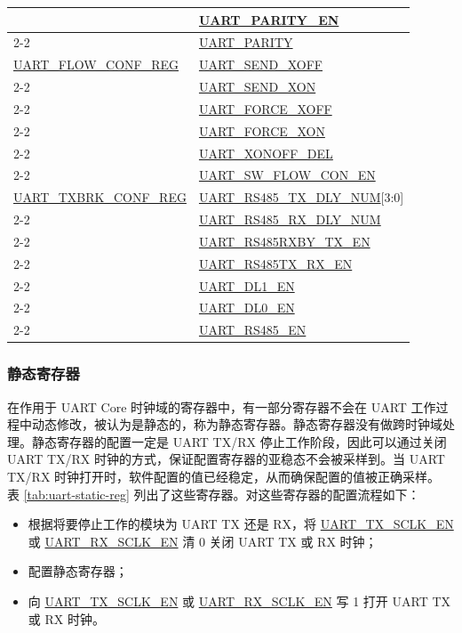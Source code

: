 \documentclass[main\_\_CN.tex]{subfiles}
\begin{document}
\begin{longtable}[c]{|m{6cm}|m{6cm}|}
 & \hyperref[fielddesc:UARTPARITYEN]{UART\_PARITY\_EN} \\\cline{2-2}
 & \hyperref[fielddesc:UARTPARITY]{UART\_PARITY} \\\hline
\hyperref[regdesc:UARTFLOWCONFREG]{UART\_FLOW\_CONF\_REG}  & \hyperref[fielddesc:UARTSENDXOFF]{UART\_SEND\_XOFF} \\\cline{2-2}
 & \hyperref[fielddesc:UARTSENDXON]{UART\_SEND\_XON} \\\cline{2-2}
 & \hyperref[fielddesc:UARTFORCEXOFF]{UART\_FORCE\_XOFF} \\\cline{2-2}
 & \hyperref[fielddesc:UARTFORCEXON]{UART\_FORCE\_XON} \\\cline{2-2}
 & \hyperref[fielddesc:UARTXONOFFDEL]{UART\_XONOFF\_DEL} \\\cline{2-2}
 & \hyperref[fielddesc:UARTSWFLOWCONEN]{UART\_SW\_FLOW\_CON\_EN} \\\hline
\hyperref[regdesc:UARTTXBRKCONFREG]{UART\_TXBRK\_CONF\_REG} & \hyperref[fielddesc:UARTRS485TXDLYNUM]{UART\_RS485\_TX\_DLY\_NUM}[3:0] \\\cline{2-2}
 & \hyperref[fielddesc:UARTRS485RXDLYNUM]{UART\_RS485\_RX\_DLY\_NUM} \\\cline{2-2}
 & \hyperref[fielddesc:UARTRS485RXBYTXEN]{UART\_RS485RXBY\_TX\_EN} \\\cline{2-2}
 & \hyperref[fielddesc:UARTRS485TXRXEN]{UART\_RS485TX\_RX\_EN} \\\cline{2-2}
 & \hyperref[fielddesc:UARTDL1EN]{UART\_DL1\_EN} \\\cline{2-2}
 & \hyperref[fielddesc:UARTDL0EN]{UART\_DL0\_EN} \\\cline{2-2}
 & \hyperref[fielddesc:UARTRS485EN]{UART\_RS485\_EN} \\\hline
\end{longtable}


\subsubsection{静态寄存器}\label{sec:uart-static-reg}

在作用于 UART Core 时钟域的寄存器中，有一部分寄存器不会在 UART 工作过程中动态修改，被认为是静态的，称为静态寄存器。静态寄存器没有做跨时钟域处理。静态寄存器的配置一定是 UART TX/RX 停止工作阶段，因此可以通过关闭 UART TX/RX 时钟的方式，保证配置寄存器的亚稳态不会被采样到。当 UART TX/RX 时钟打开时，软件配置的值已经稳定，从而确保配置的值被正确采样。
表 \ref{tab:uart-static-reg} 列出了这些寄存器。对这些寄存器的配置流程如下：

\begin{itemize}
    \item 根据将要停止工作的模块为 UART TX 还是 RX，将 \hyperref[fielddesc:UARTTXSCLKEN]{UART\_TX\_SCLK\_EN} 或 \hyperref[fielddesc:UARTRXSCLKEN]{UART\_RX\_SCLK\_EN} 清 0 关闭 UART TX 或 RX 时钟；
    \item 配置静态寄存器；
    \item 向 \hyperref[fielddesc:UARTTXSCLKEN]{UART\_TX\_SCLK\_EN} 或 \hyperref[fielddesc:UARTRXSCLKEN]{UART\_RX\_SCLK\_EN} 写 1 打开 UART TX 或 RX 时钟。
\end{itemize}
\end{document}
